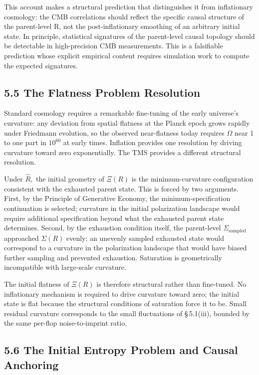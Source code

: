 \documentclass[11pt,oneside]{report}
\theoremstyle{definition}
\theoremstyle{remark}
\begin{document}
This account makes a structural prediction that distinguishes it from
inflationary cosmology: the CMB correlations should reflect the specific
causal structure of the parent-level R, not the post-inflationary
smoothing of an arbitrary initial state. In principle, statistical
signatures of the parent-level causal topology should be detectable in
high-precision CMB measurements. This is a falsifiable prediction whose
explicit empirical content requires simulation work to compute the
expected signatures.

\subsection*{5.5 The Flatness Problem Resolution}

Standard cosmology requires a remarkable fine-tuning of the early
universe's curvature: any deviation from spatial flatness at the Planck
epoch grows rapidly under Friedmann evolution, so the observed
near-flatness today requires \ensuremath{\Omega} near 1 to one part in \ensuremath{10^{60}} at early
times. Inflation provides one resolution by driving curvature toward
zero exponentially. The TMS provides a different structural resolution.

Under \ensuremath{\hat{R},} the initial geometry of \ensuremath{\Xi (R)} is the minimum-curvature
configuration consistent with the exhausted parent state. This is forced
by two arguments. First, by the Principle of Generative Economy, the
minimum-specification continuation is selected; curvature in the initial
polarization landscape would require additional specification beyond
what the exhausted parent state determines. Second, by the exhaustion
condition itself, the parent-level \ensuremath{\Sigma_{\mathrm{sampled}}} approached \ensuremath{\Sigma (R)} evenly; an
unevenly sampled exhausted state would correspond to a curvature in the
polarization landscape that would have biased further sampling and
prevented exhaustion. Saturation is geometrically incompatible with
large-scale curvature.

The initial flatness of \ensuremath{\Xi (R)} is therefore structural rather than
fine-tuned. No inflationary mechanism is required to drive curvature
toward zero; the initial state is flat because the structural conditions
of saturation force it to be. Small residual curvature corresponds to
the small fluctuations of \S\,5.1(iii), bounded by the same per-flop
noise-to-imprint ratio.

\subsection*{5.6 The Initial Entropy Problem and Causal Anchoring}
\end{document}
